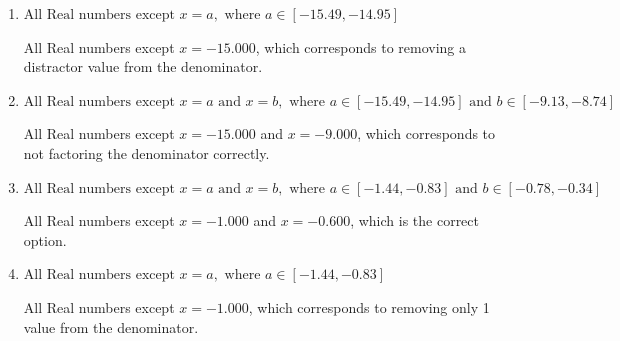 \documentclass{extbook}[14pt]
\begin{document}
\begin{enumerate}
{\begin{enumerate}[label=\Alph*.]
This corresponds to thinking the denominator has complex roots or that rational functions have a domain of all Real numbers.
\item \( \text{All Real numbers except } x = a, \text{ where } a \in [-15.49, -14.95] \)

All Real numbers except $x = -15.000$, which corresponds to removing a distractor value from the denominator.
\item \( \text{All Real numbers except } x = a \text{ and } x = b, \text{ where } a \in [-15.49, -14.95] \text{ and } b \in [-9.13, -8.74] \)

All Real numbers except $x = -15.000$ and $x = -9.000$, which corresponds to not factoring the denominator correctly.
\item \( \text{All Real numbers except } x = a \text{ and } x = b, \text{ where } a \in [-1.44, -0.83] \text{ and } b \in [-0.78, -0.34] \)

All Real numbers except $x = -1.000$ and $x = -0.600$, which is the correct option.
\item \( \text{All Real numbers except } x = a, \text{ where } a \in [-1.44, -0.83] \)

All Real numbers except $x = -1.000$, which corresponds to removing only 1 value from the denominator.
\end{enumerate}

}
\end{enumerate}
\end{document}
